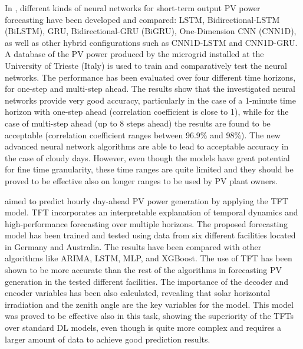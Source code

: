 In \cite{MELLIT2021276}, different kinds of neural networks for short-term output PV power forecasting have been developed and compared: LSTM, Bidirectional-LSTM (BiLSTM), GRU, Bidirectional-GRU (BiGRU), One-Dimension CNN (CNN1D), as well as other hybrid configurations such as CNN1D-LSTM and CNN1D-GRU.
A database of the PV power produced by the microgrid installed at the University of Trieste (Italy) is used to train and comparatively test the neural networks.
The performance has been evaluated over four different time horizons, for one-step and multi-step ahead.
The results show that the investigated neural networks provide very good accuracy, particularly in the case of a 1-minute time horizon with one-step ahead (correlation coefficient is close to 1), while for the case of multi-step ahead (up to 8 steps ahead) the results are found to be acceptable (correlation coefficient ranges between 96.9\% and 98\%).
The new advanced neural network algorithms are able to lead to acceptable accuracy in the case of cloudy days.
However, even though the models have great potential for fine time granularity, these time ranges are quite limited and they should be proved to be effective also on longer ranges to be used by PV plant owners.

\cite{en15145232} aimed to predict hourly day-ahead PV power generation by applying the TFT model.
TFT incorporates an interpretable explanation of temporal dynamics and high-performance forecasting over multiple horizons.
The proposed forecasting model has been trained and tested using data from six different facilities located in Germany and Australia.
The results have been compared with other algorithms like ARIMA, LSTM, MLP, and XGBoost.
The use of TFT has been shown to be more accurate than the rest of the algorithms in forecasting PV generation in the tested different facilities.
The importance of the decoder and encoder variables has been also calculated, revealing that solar horizontal irradiation and the zenith angle are the key variables for the model.
This model was proved to be effective also in this task, showing the superiority of the TFTs over standard DL models, even though is quite more complex and requires a larger amount of data to achieve good prediction results.
